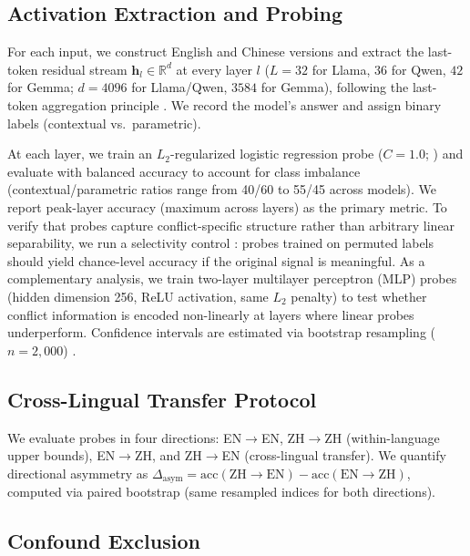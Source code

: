 \subsection{Activation Extraction and Probing}
\label{sec:extraction}

For each input, we construct English and Chinese versions and extract the last-token residual stream $\mathbf{h}_l \in \mathbb{R}^d$ at every layer $l$ ($L = 32$ for Llama, $36$ for Qwen, $42$ for Gemma; $d = 4096$ for Llama/Qwen, $3584$ for Gemma), following the last-token aggregation principle \citep{belinkov2022probing}.
We record the model's answer and assign binary labels (contextual vs.\ parametric).

\label{sec:probing}
At each layer, we train an $L_2$-regularized logistic regression probe ($C = 1.0$; \citealt{belinkov2022probing, hewitt2019designing}) and evaluate with balanced accuracy to account for class imbalance (contextual/parametric ratios range from 40/60 to 55/45 across models).
We report peak-layer accuracy (maximum across layers) as the primary metric.
To verify that probes capture conflict-specific structure rather than arbitrary linear separability, we run a selectivity control \citep{hewitt2019designing}: probes trained on permuted labels should yield chance-level accuracy if the original signal is meaningful.
As a complementary analysis, we train two-layer multilayer perceptron (MLP) probes (hidden dimension 256, ReLU activation, same $L_2$ penalty) to test whether conflict information is encoded non-linearly at layers where linear probes underperform.
Confidence intervals are estimated via bootstrap resampling ($n = 2{,}000$) \citep{ulmer2022deep}.

\subsection{Cross-Lingual Transfer Protocol}
\label{sec:transfer}

We evaluate probes in four directions: EN$\to$EN, ZH$\to$ZH (within-language upper bounds), EN$\to$ZH, and ZH$\to$EN (cross-lingual transfer).
We quantify directional asymmetry as $\Delta_{\text{asym}} = \text{acc}(\text{ZH}{\to}\text{EN}) - \text{acc}(\text{EN}{\to}\text{ZH})$, computed via paired bootstrap (same resampled indices for both directions).

\subsection{Confound Exclusion}
\label{sec:confound_method}

